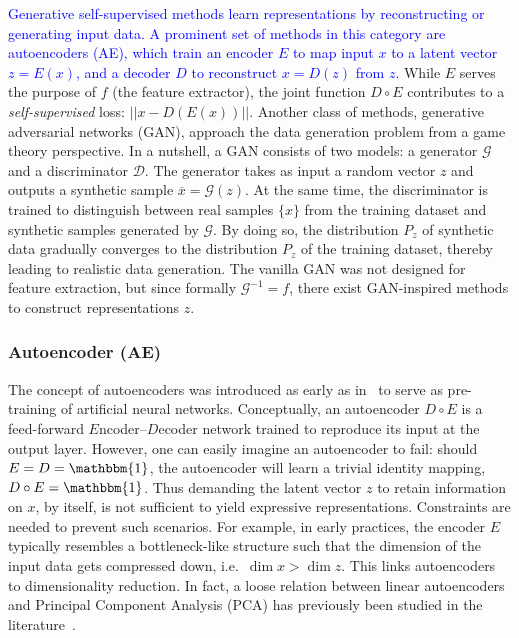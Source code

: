 \documentclass[lettersize,journal]{IEEEtran}
\begin{document}
\textcolor{blue}{Generative self-supervised methods learn representations by reconstructing or generating input data. A prominent set of methods in this category are autoencoders (AE), which train an encoder $E$ to map input $x$ to a latent vector $z=E(x)$, and a decoder $D$ to reconstruct $x=D(z)$ from $z$.} While $E$ serves the purpose of $f$ (the feature extractor), the joint function $D\circ E$ contributes to a \textit{self-supervised} loss: $\vert\vert x-D(E(x))\vert\vert$.  Another class of methods, generative adversarial networks (GAN), approach the data generation problem from a game theory perspective. In a nutshell, a GAN consists of two models: a generator $\mathcal{G}$ and a discriminator $\mathcal{D}$. The generator takes as input a random vector $z$ and outputs a synthetic sample $\overline{x}=\mathcal{G}(z)$. At the same time, the discriminator is trained to distinguish between real samples $\{x\}$ from the training dataset and synthetic samples generated by $\mathcal{G}$. By doing so, the distribution $P_z$ of synthetic data gradually converges to the distribution $P_z$ of the training dataset, thereby leading to realistic data generation. The vanilla GAN was not designed for feature extraction, but since formally $\mathcal{G}^{-1}=f$, there exist GAN-inspired methods to construct representations $z$.

\subsubsection{Autoencoder (AE)}

The concept of autoencoders was introduced as early as in~\cite{ballard1987modular} to serve as
pre-training of artificial neural networks. Conceptually, an autoencoder $D\circ E$ is a feed-forward $E$ncoder--$D$ecoder network trained to reproduce its input at the output layer. However, one can easily imagine an autoencoder to fail: should $E=D=\mathbbm{1}$, the autoencoder will learn a trivial identity mapping, $D\circ E=\mathbbm{1}$. Thus demanding the latent vector $z$ to retain information on $x$, by itself, is not sufficient to yield expressive representations. Constraints are needed to prevent such scenarios. For example, in early practices, the encoder $E$ typically resembles a bottleneck-like structure such that the dimension of the input data gets compressed down, i.e.\ $\dim x > \dim z$. This links autoencoders to dimensionality reduction. In fact, a loose relation between linear autoencoders and Principal Component Analysis (PCA) \cite{wold1987principal} has previously been studied in the literature~\cite{plaut2018principal}.
\end{document}
